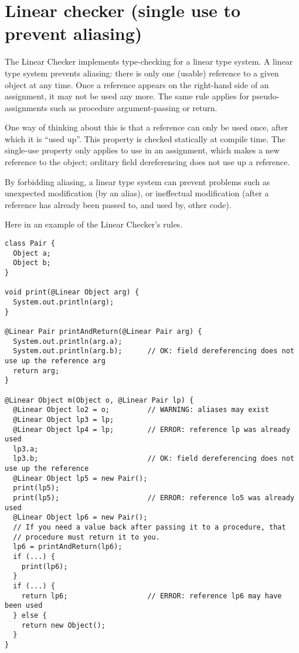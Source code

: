\htmlhr
\chapter{Linear checker (single use to prevent aliasing)\label{linear-checker}}

The Linear Checker implements type-checking for a linear type system.  A
linear type system prevents aliasing:  there is only one (usable) reference
to a given object at any time.  Once a reference appears on the right-hand
side of an assignment, it may not be used any more.  The same rule applies
for pseudo-assignments such as procedure argument-passing or return.

One way of thinking about this is that a reference can only be used once,
after which it is ``used up''.  This property is checked statically at
compile time.  The single-use property only applies to use in an
assignment, which makes a new reference to the object; orditary field
dereferencing does not use up a reference.

By forbidding aliasing, a linear type system can prevent problems such as
unexpected modification (by an alias), or ineffectual modification (after a
reference has already been passed to, and used by, other code).






Here in an example of the Linear Checker's rules.

\begin{Verbatim}
class Pair {
  Object a;
  Object b;
}

void print(@Linear Object arg) {
  System.out.println(arg);
}

@Linear Pair printAndReturn(@Linear Pair arg) {
  System.out.println(arg.a);
  System.out.println(arg.b);      // OK: field dereferencing does not use up the reference arg
  return arg;
}

@Linear Object m(Object o, @Linear Pair lp) {
  @Linear Object lo2 = o;         // WARNING: aliases may exist
  @Linear Object lp3 = lp;          
  @Linear Object lp4 = lp;        // ERROR: reference lp was already used
  lp3.a;                            
  lp3.b;                          // OK: field dereferencing does not use up the reference
  @Linear Object lp5 = new Pair();
  print(lp5);      
  print(lp5);                     // ERROR: reference lo5 was already used
  @Linear Object lp6 = new Pair();
  // If you need a value back after passing it to a procedure, that
  // procedure must return it to you.
  lp6 = printAndReturn(lp6);
  if (...) {
    print(lp6);
  }
  if (...) {
    return lp6;                   // ERROR: reference lp6 may have been used
  } else {
    return new Object();
  }
}
\end{Verbatim}


